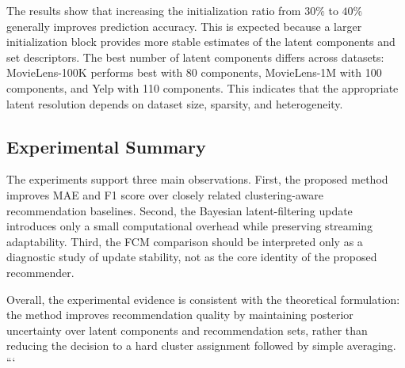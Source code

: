 \documentclass{article}
\theoremstyle{plain}
\theoremstyle{definition}
\theoremstyle{remark}
\begin{document}
The results show that increasing the initialization ratio from \(30\%\) to \(40\%\) generally improves prediction accuracy. This is expected because a larger initialization block provides more stable estimates of the latent components and set descriptors. The best number of latent components differs across datasets: MovieLens-100K performs best with 80 components, MovieLens-1M with 100 components, and Yelp with 110 components. This indicates that the appropriate latent resolution depends on dataset size, sparsity, and heterogeneity.

\subsection{Experimental Summary}
\label{subsec:experimental_summary}

The experiments support three main observations. First, the proposed method improves MAE and F1 score over closely related clustering-aware recommendation baselines. Second, the Bayesian latent-filtering update introduces only a small computational overhead while preserving streaming adaptability. Third, the FCM comparison should be interpreted only as a diagnostic study of update stability, not as the core identity of the proposed recommender.

Overall, the experimental evidence is consistent with the theoretical formulation: the method improves recommendation quality by maintaining posterior uncertainty over latent components and recommendation sets, rather than reducing the decision to a hard cluster assignment followed by simple averaging.
```
\end{document}
